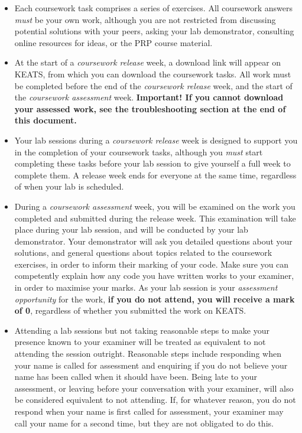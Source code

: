 \documentclass[11pt]{article}
\begin{document}
\begin{itemize}
\item Each coursework task comprises a series of exercises. All coursework answers \emph{must} be your own work, although you are not restricted from discussing potential solutions with your peers, asking your lab demonstrator, consulting online resources for ideas, or the PRP course material. 

\item At the start of a \emph{coursework release} week, a download link will appear on KEATS, from which you can download the coursework tasks. All work must be completed before the end of the \emph{coursework release} week, and the start of the \emph{coursework assessment} week. \textbf{Important! If you cannot download your assessed work, see the troubleshooting section at the end of this document.}

\item Your lab sessions during a \emph{coursework release} week is designed to support you in the completion of your coursework tasks, although you \emph{must} start completing these tasks before your lab session to give yourself a full week to complete them. A release week ends for everyone at the same time, regardless of when your lab is scheduled.

\item During a \emph{coursework assessment} week, you will be examined on the work you completed and submitted during the release week. This examination will take place during your lab session, and will be conducted by your lab demonstrator. Your demonstrator will ask you detailed questions about your solutions, and general questions about topics related to the coursework exercises, in order to inform their marking of your code. Make sure you can competently explain how any code you have written works to your examiner, in order to maximise your marks. As your lab session is your {\em assessment opportunity} for the work, \textbf{if you do not attend, you will receive a mark of 0}, regardless of whether you submitted the work on KEATS.

\item Attending a lab sessions but not taking reasonable steps to make your presence known to your examiner will be treated as equivalent to not attending the session outright. Reasonable steps include responding when your name is called for assessment and enquiring if you do not believe your name has been called when it should have been. Being late to your assessment, or leaving before your conversation with your examiner, will also be considered equivalent to not attending. If, for whatever reason, you do not respond when your name is first called for assessment, your examiner may call your name for a second time, but they are not obligated to do this. 


\end{itemize}
\end{document}
